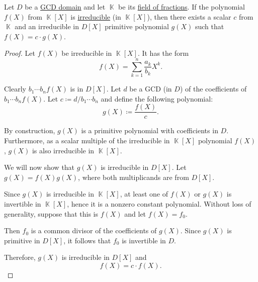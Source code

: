 \begin{lemma}\label{thm:irreducible_primitive_polynomial_in_field_of_fractions}
  Let \( D \) be a \hyperref[def:gcd_domain]{GCD domain} and let \( \BbbK \) be its \hyperref[def:field_of_fractions]{field of fractions}. If the polynomial \( f(X) \) from \( \BbbK[X] \) is \hyperref[def:domain_divisibility/irreducible]{irreducible} (in \( \BbbK[X] \)), then there exists a scalar \( c \) from \( \BbbK \) and an irreducible in \( D[X] \) primitive polynomial \( g(X) \) such that \( f(X) = c \cdot g(X) \).
\end{lemma}
\begin{proof}
  Let \( f(X) \) be irreducible in \( \BbbK[X] \). It has the form
  \begin{equation*}
    f(X) = \sum_{k=1}^n \frac {a_k} {b_k} X^k.
  \end{equation*}

  Clearly \( b_1 \cdots b_n f(X) \) is in \( D[X] \). Let \( d \) be a GCD (in \( D \)) of the coefficients of \( b_1 \cdots b_n f(X) \). Let \( c \coloneqq d / b_1 \cdots b_n \) and define the following polynomial:
  \begin{equation*}
    g(X) \coloneqq \frac {f(X)} c.
  \end{equation*}

  By construction, \( g(X) \) is a primitive polynomial with coefficients in \( D \). Furthermore, as a scalar multiple of the irreducible in \( \BbbK[X] \) polynomial \( f(X) \), \( g(X) \) is also irreducible in \( \BbbK[X] \).

  We will now show that \( g(X) \) is irreducible in \( D[X] \). Let \( g(X) = f(X) g(X) \), where both multiplicands are from \( D[X] \).

  Since \( g(X) \) is irreducible in \( \BbbK[X] \), at least one of \( f(X) \) or \( g(X) \) is invertible in \( \BbbK[X] \), hence it is a nonzero constant polynomial. Without loss of generality, suppose that this is \( f(X) \) and let \( f(X) = f_0 \).

  Then \( f_0 \) is a common divisor of the coefficients of \( g(X) \). Since \( g(X) \) is primitive in \( D[X] \), it follows that \( f_0 \) is invertible in \( D \).

  Therefore, \( g(X) \) is irreducible in \( D[X] \) and
  \begin{equation*}
    f(X) = c \cdot f(X).
  \end{equation*}
\end{proof}

